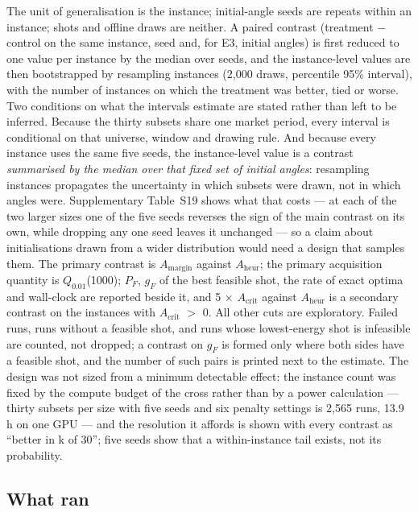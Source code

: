 \documentclass{ieeeaccess}
\begin{document}
The unit of generalisation is the instance; initial-angle seeds are repeats within an instance; shots and offline draws are neither. A paired contrast (treatment $-$ control on the same instance, seed and, for E3, initial angles) is first reduced to one value per instance by the median over seeds, and the instance-level values are then bootstrapped by resampling instances (2,000 draws, percentile 95\% interval), with the number of instances on which the treatment was better, tied or worse. Two conditions on what the intervals estimate are stated rather than left to be inferred. Because the thirty subsets share one market period, every interval is conditional on that universe, window and drawing rule. And because every instance uses the same five seeds, the instance-level value is a contrast \textit{summarised by the median over that fixed set of initial angles}: resampling instances propagates the uncertainty in which subsets were drawn, not in which angles were. Supplementary Table~S19 shows what that costs --- at each of the two larger sizes one of the five seeds reverses the sign of the main contrast on its own, while dropping any one seed leaves it unchanged --- so a claim about initialisations drawn from a wider distribution would need a design that samples them. The primary contrast is $A_{\mathrm{margin}}$ against $A_{\mathrm{heur}}$; the primary acquisition quantity is $Q_{0.01}$(1000); $P_{F}$, $g_{F}$ of the best feasible shot, the rate of exact optima and wall-clock are reported beside it, and 5 $\times$ $A_{\mathrm{crit}}$ against $A_{\mathrm{heur}}$ is a secondary contrast on the instances with $A_{\mathrm{crit}}$ $>$ 0. All other cuts are exploratory. Failed runs, runs without a feasible shot, and runs whose lowest-energy shot is infeasible are counted, not dropped; a contrast on $g_{F}$ is formed only where both sides have a feasible shot, and the number of such pairs is printed next to the estimate. The design was not sized from a minimum detectable effect: the instance count was fixed by the compute budget of the cross rather than by a power calculation --- thirty subsets per size with five seeds and six penalty settings is 2,565 runs, 13.9 h on one GPU --- and the resolution it affords is shown with every contrast as ``better in k of 30''; five seeds show that a within-instance tail exists, not its probability.


\subsection{What ran}
\end{document}
